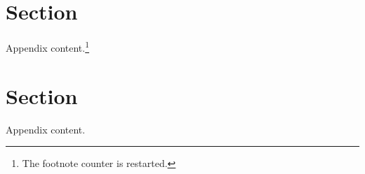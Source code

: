 \newpage
\begin{appendices}
	
\setcounter{page}{1}										%
\setcounter{footnote}{0}									%
\renewcommand{\thetable}{\thesection.\arabic{table}}		%
\renewcommand{\thefigure}{\thesection.\arabic{figure}}		%
\renewcommand{\theequation}{\thesection.\arabic{equation}}	%

\section{Section} %
\vspace{0.7cm}
\iftoggle{toclinks}{\gototoc}{} %
\iftoggle{cboxes}{	   				  %
	\begin{boxeditems}
		\item Issue.
	\end{boxeditems}}{}
\setcounter{table}{0}
\setcounter{figure}{0}
\setcounter{equation}{0}

Appendix content.\footnote{The footnote counter is restarted.}





\section{Section} %
\vspace{0.7cm}
\iftoggle{toclinks}{\gototoc}{} %
\iftoggle{cboxes}{	   				  %
	\begin{boxeditems}
		\item Issue.
	\end{boxeditems}}{}
\setcounter{table}{0}
\setcounter{figure}{0}
\setcounter{equation}{0}

Appendix content.





\end{appendices}